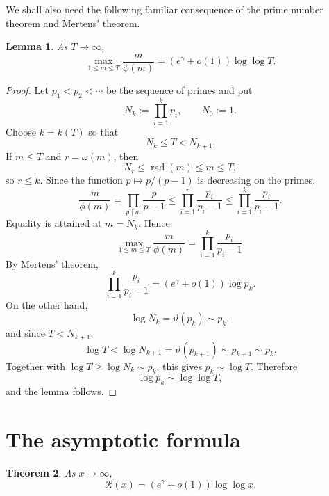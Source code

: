 \documentclass[11pt,a4paper]{amsart}
\DeclareMathOperator{\rad}{rad}
\newtheorem{theorem}{Theorem}[section]
\newtheorem{lemma}[theorem]{Lemma}
\begin{document}
We shall also need the following familiar consequence of the prime number theorem and Mertens' theorem.

\begin{lemma}
As \(T\to\infty\),
\[
\max_{1\le m\le T}\frac m{\phi(m)}
=(e^\gamma+o(1))\log\log T.
\]
\end{lemma}

\begin{proof}
Let \(p_1<p_2<\cdots\) be the sequence of primes and put
\[
N_k:=\prod_{i=1}^k p_i,
\qquad N_0:=1.
\]
Choose \(k=k(T)\) so that
\[
N_k\le T<N_{k+1}.
\]
If \(m\le T\) and \(r=\omega(m)\), then
\[
N_r\le \rad(m)\le m\le T,
\]
so \(r\le k\). Since the function \(p\mapsto p/(p-1)\) is decreasing on the primes,
\[
\frac m{\phi(m)}
=\prod_{p\mid m}\frac p{p-1}
\le \prod_{i=1}^r \frac{p_i}{p_i-1}
\le \prod_{i=1}^k\frac{p_i}{p_i-1}.
\]
Equality is attained at \(m=N_k\). Hence
\[
\max_{1\le m\le T}\frac m{\phi(m)}
=
\prod_{i=1}^k\frac{p_i}{p_i-1}.
\]
By Mertens' theorem,
\[
\prod_{i=1}^k\frac{p_i}{p_i-1}
=
(e^\gamma+o(1))\log p_k.
\]
On the other hand,
\[
\log N_k=\vartheta(p_k)\sim p_k,
\]
and since \(T<N_{k+1}\),
\[
\log T<\log N_{k+1}=\vartheta(p_{k+1})\sim p_{k+1}\sim p_k.
\]
Together with \(\log T\ge \log N_k\sim p_k\), this gives \(p_k\sim \log T\). Therefore
\[
\log p_k\sim \log\log T,
\]
and the lemma follows.
\end{proof}

\section{The asymptotic formula}

\begin{theorem}
As \(x\to\infty\),
\[
\mathcal R(x)
=
(e^\gamma+o(1))\log\log x .
\]
\end{theorem}
\end{document}
